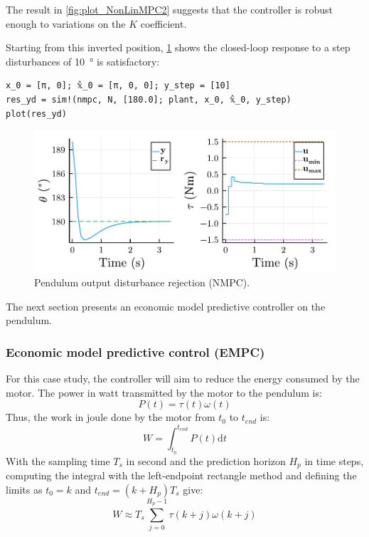 The result in \cref{fig:plot_NonLinMPC2} suggests that the controller is robust enough to variations on the $K$ coefficient. 

Starting from this inverted position, \cref{fig:plot_NonLinMPC3} shows the closed-loop response to a step disturbances of \SI{10}{\degree} is satisfactory:
\begin{verbatim}
x_0 = [π, 0]; 𝕩̂_0 = [π, 0, 0]; y_step = [10]
res_yd = sim!(nmpc, N, [180.0]; plant, x_0, 𝕩̂_0, y_step)
plot(res_yd)
\end{verbatim}

\begin{figure}[ht]
    \centering
    \includegraphics[width=\columnwidth]{fig/plot_NonLinMPC3.pdf}
    \caption{Pendulum output disturbance rejection (NMPC).}\label{fig:plot_NonLinMPC3}
\end{figure}

The next section presents an economic model predictive controller on the pendulum.

\subsubsection{Economic model predictive control (EMPC)}

For this case study, the controller will aim to reduce the energy consumed by the motor. The power in watt transmitted by the motor to the pendulum is:
\begin{equation}
P(t) = \tau(t) \omega(t) 
\end{equation}
Thus, the work in joule done by the motor from $t_0$ to $t_{end}$ is:
\begin{equation}
W = \int_{t_0}^{t_{end}} P(t) \mathrm{d}t 
\end{equation}
With the sampling time $T_s$ in second and the prediction horizon $H_p$ in time steps, computing the integral with the left-endpoint rectangle method and defining the limits as $t_0=k$ and $t_{end} = (k + H_p) T_s$ give:
\begin{equation}\label{eq:pendulum_W}
W \approx T_s \sum_{j = 0}^{H_p - 1} \tau(k+j) \omega(k+j) 
\end{equation}

